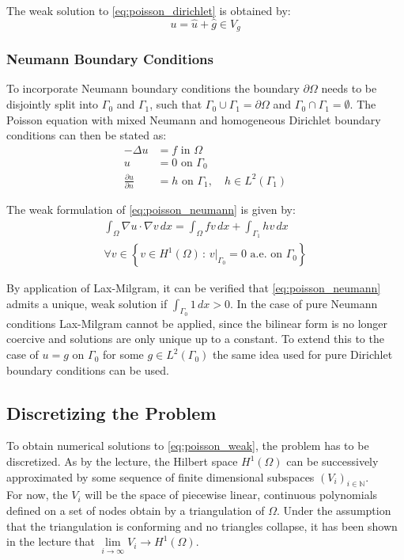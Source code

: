 \documentclass[11pt,a4paper]{article}
\begin{document}
\begin{multicols}{2}
The weak solution to \autoref{eq:poisson_dirichlet} is obtained by:
$$u = \hat{u} + \hat{g} \in V_g$$

\subsubsection*{Neumann Boundary Conditions}
To incorporate Neumann boundary conditions the boundary $\partial\Omega$ needs
to be disjointly split into $\Gamma_0$ and $\Gamma_1$, such that
$\Gamma_0 \cup \Gamma_1 = \partial\Omega$ and $\Gamma_0 \cap \Gamma_1 = \emptyset$.
The Poisson equation with mixed Neumann and homogeneous Dirichlet boundary
conditions can then be stated as:
\begin{equation} \label{eq:poisson_neumann}
  \begin{split}
    -\Delta u &= f  \text{ in } \Omega \\
    u &= 0 \text{ on } \Gamma_0 \\
    \frac{\partial u}{\partial n} &= h \text{ on } \Gamma_1, \quad h\in L^2(\Gamma_1)
  \end{split}
\end{equation}

The weak formulation of \autoref{eq:poisson_neumann} is given by:
\begin{multline}
  \int_\Omega \nabla u \cdot \nabla v\,dx
  = \int_\Omega fv\,dx + \int_{\Gamma_1}hv\,dx \\
  \forall v \in \left\{ v \in H^1(\Omega)\, :\, v\vert_{\Gamma_0} = 0 \text{ a.e. on } \Gamma_0\right\}
\end{multline}

By application of Lax-Milgram, it can be verified that \autoref{eq:poisson_neumann}
admits a unique, weak solution if $\int_{\Gamma_0}1\,dx > 0$.
In the case of pure Neumann conditions Lax-Milgram cannot be applied, since the
bilinear form is no longer coercive and solutions are only unique up to a constant.
To extend this to the case of $u = g$ on $\Gamma_0$ for some $g \in L^2(\Gamma_0)$
the same idea used for pure Dirichlet boundary conditions can be used.

\subsection*{Discretizing the Problem}
To obtain numerical solutions to \autoref{eq:poisson_weak}, the problem has to be
discretized. As by the lecture, the Hilbert space $H^1(\Omega)$ can be
successively approximated by some sequence of finite dimensional subspaces
$(V_i)_{i\in \mathbb{N}}$.\\
For now, the $V_i$ will be the space of piecewise linear, continuous
polynomials defined on a set of nodes obtain by a triangulation of $\Omega$.
Under the assumption that the triangulation is conforming and no triangles
collapse, it has been shown in the lecture that $\lim\limits_{i\to\infty}V_i \to
H^1(\Omega)$.


\end{multicols}
\end{document}
